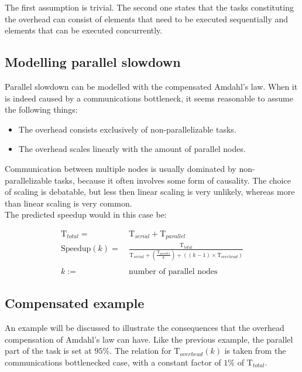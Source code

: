 The first assumption is trivial. The second one states that the tasks constituting the overhead can consist of elements that need to be executed sequentially and elements that can be executed concurrently.

\subsection{Modelling parallel slowdown}

\hspace{4mm} Parallel slowdown can be modelled with the compensated Amdahl's law. When it is indeed caused by a communications bottleneck, it seems reasonable to assume the following things:

\begin{itemize}
    \item The overhead consists exclusively of non-parallelizable tasks.
    \item The overhead scales linearly with the amount of parallel nodes.
\end{itemize}

Communication between multiple nodes is usually dominated by non-parallelizable tasks, because it often involves some form of causality. The choice of scaling is debatable, but less then linear scaling is very unlikely, whereas more than linear scaling is very common.\\

\noindent The predicted speedup would in this case be:

\begin{equation} \label{Amd 3 eq.}
    \begin{split}
        \text{T}_{total} = & \ \text{T}_{serial} + \text{T}_{parallel}\\
        \text{Speedup}(k) = & \ \frac{\text{T}_{total}}{\text{T}_{serial} + (\frac{\text{T}_{parallel}}{k}) + ((k - 1) \times \text{T}_{overhead})}\\
        \\
        k := & \ \text{number of parallel nodes}
    \end{split}
\end{equation}

\newpage

\subsection{Compensated example}

\hspace{4mm} An example will be discussed to illustrate the consequences that the overhead compensation of Amdahl's law can have. Like the previous example, the parallel part of the task is set at $95 \%$. The relation for $\text{T}_{overhead}(k)$ is taken from the communications bottlenecked case, with a constant factor of $1 \%$ of $\text{T}_{total}$.

